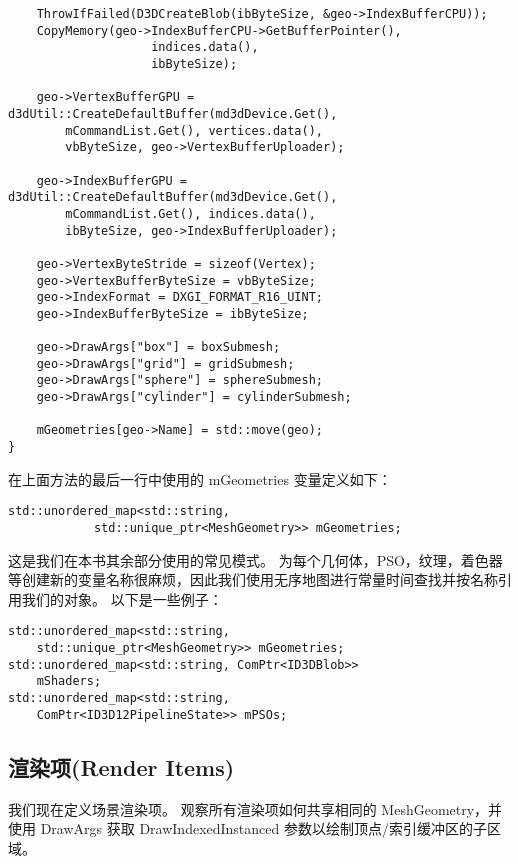 \begin{lstlisting}
    ThrowIfFailed(D3DCreateBlob(ibByteSize, &geo->IndexBufferCPU));
    CopyMemory(geo->IndexBufferCPU->GetBufferPointer(), 
                    indices.data(), 
                    ibByteSize);

    geo->VertexBufferGPU = d3dUtil::CreateDefaultBuffer(md3dDevice.Get(),
        mCommandList.Get(), vertices.data(), 
        vbByteSize, geo->VertexBufferUploader);

    geo->IndexBufferGPU = d3dUtil::CreateDefaultBuffer(md3dDevice.Get(),
        mCommandList.Get(), indices.data(), 
        ibByteSize, geo->IndexBufferUploader);

    geo->VertexByteStride = sizeof(Vertex);
    geo->VertexBufferByteSize = vbByteSize;
    geo->IndexFormat = DXGI_FORMAT_R16_UINT;
    geo->IndexBufferByteSize = ibByteSize;

    geo->DrawArgs["box"] = boxSubmesh;
    geo->DrawArgs["grid"] = gridSubmesh;
    geo->DrawArgs["sphere"] = sphereSubmesh;
    geo->DrawArgs["cylinder"] = cylinderSubmesh;

    mGeometries[geo->Name] = std::move(geo);
}
\end{lstlisting}

\begin{flushleft}
在上面方法的最后一行中使用的 mGeometries 变量定义如下：\\
\end{flushleft}

\begin{lstlisting}
std::unordered_map<std::string, 
            std::unique_ptr<MeshGeometry>> mGeometries;
\end{lstlisting}

\begin{flushleft}
这是我们在本书其余部分使用的常见模式。 为每个几何体，PSO，纹理，着色器等创建新的变量名称很麻烦，因此我们使用无序地图进行常量时间查找并按名称引用我们的对象。 以下是一些例子：\\
\end{flushleft}

\begin{lstlisting}
std::unordered_map<std::string,
    std::unique_ptr<MeshGeometry>> mGeometries;
std::unordered_map<std::string, ComPtr<ID3DBlob>>
    mShaders;
std::unordered_map<std::string,
    ComPtr<ID3D12PipelineState>> mPSOs;
\end{lstlisting}

\subsection{渲染项(Render Items)}
\begin{flushleft}
我们现在定义场景渲染项。 观察所有渲染项如何共享相同的 MeshGeometry，并使用 DrawArgs 获取 DrawIndexedInstanced 参数以绘制顶点/索引缓冲区的子区域。\\
\end{flushleft}

